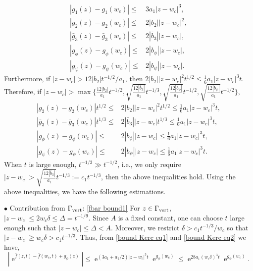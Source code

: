\documentclass[cmp]{svjour}
\numberwithin{theorem}{section}
\numberwithin{equation}{section}
\DeclareMathOperator{\e}{e}
\begin{document}
\begin{subequations}\label{bound Kerc eq1}
	\begin{align}
		\left|g_1(z)-g_1(w_c)\right| \leq & 3a_1 |z-w_c|^3, \\
		\left|g_2(z)-g_2(w_c)\right| \leq & 2|b_2| |z-w_c|^2, \\
		\left|\bar{g}_3(z)-\bar{g}_3(w_c)\right| \leq & 2|\bar{b}_3| |z-w_c|, \\
		\left|g_{\phi}(z)-g_{\phi}(w_c)\right| \leq & 2|b_{\phi}| |z-w_c|, \\
		\left|g_{\psi}(z)-g_{\psi}(w_c)\right| \leq & 2|b_{\psi}| |z-w_c|.
	\end{align}
\end{subequations}
Furthermore, if $|z-w_c| > 12 |b_2| t^{-1/2} / a_1 $, then $2|b_2| |z-w_c|^2 t^{1/2} \leq \frac{1}{6} a_1 |z-w_c|^3 t$. Therefore, if $ |z-w_c| > \max \{  \frac{12 |b_2|}{a_1} t^{-1/2} ,\allowbreak \sqrt{\frac{12 |\bar{b}_3|}{a_1}} t^{-1/3}, \sqrt{\frac{12 |b_{\phi}|}{a_1}} t^{-1/2}, \sqrt{\frac{12 |b_{\psi}|}{a_1}} t^{-1/2}\}$,
\begin{subequations} \label{bound Kerc eq2}
	\begin{align}
		\left|g_2(z)-g_2(w_c)\right|t^{1/2} \leq & 2|b_2| |z-w_c|^2 t^{1/2} \leq \frac{1}{6} a_1 |z-w_c|^3 t, \\
		\left|\bar{g}_3(z)-\bar{g}_3(w_c)\right| t^{1/3} \leq & 2|\bar{b}_3| |z-w_c| t^{1/3}  \leq \frac{1}{6} a_1 |z-w_c|^3 t, \\
		\left|g_{\phi}(z)-g_{\phi}(w_c)\right| \leq & 2|b_{\phi}| |z-w_c| \leq \frac{1}{6} a_1 |z-w_c|^3 t, \\
		\left|g_{\psi}(z)-g_{\psi}(w_c)\right| \leq & 2|b_{\psi}| |z-w_c| \leq \frac{1}{6} a_1 |z-w_c|^3 t.
	\end{align}
\end{subequations}
When $t$ is large enough, $t^{-1/3} \gg t^{-1/2}$, i.e., we only require $|z-w_c| > \sqrt{\frac{12 |\bar{b}_3|}{a_1}} t^{-1/3} := c_1 t^{-1/3}$, then the above inequalities hold. Using the above inequalities, we have the following estimations.


$\bullet$ Contribution from $\Gamma_{\rm vert}$: \eqref{fbar bound1} \newline For $z \in \Gamma_{\rm vert}$, $|z-w_c| \leq 2 w_c \delta \leq \Delta = t^{-1/9}$. Since $A$ is a fixed constant, one can choose $t$ large enough such that $|z-w_c| \leq \Delta < A$. Moreover, we restrict $\delta > c_1 t^{-1/3} / w_c$ so that $|z - w_c| \geq w_c \delta > c_1 t^{-1/3}$. Thus, from \eqref{bound Kerc eq1} and \eqref{bound Kerc eq2} we have,
\begin{equation*}
	\left| \e^{\bar{f}(z,t) - \bar{f}(w_c, t) + g_{\phi}(z) } \right| \leq \e^{(3a_1 +a_1/2)|z-w_c|^3 t} \e^{g_{\phi}(w_c)} \leq \e^{28 a_1 (w_c \delta)^3t} \e^{g_{\phi}(w_c)}.
\end{equation*}
\end{document}
